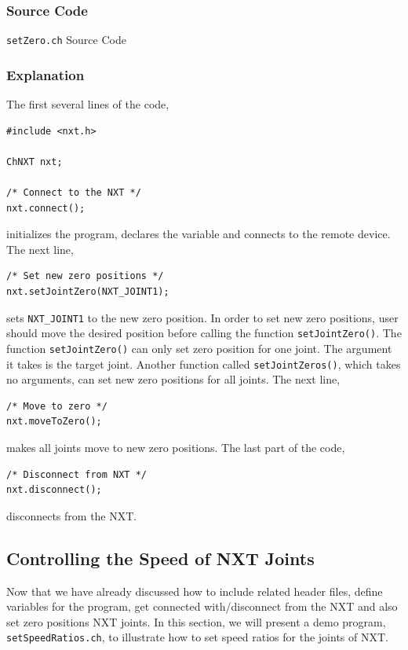 \documentclass[11pt]{article}
\begin{document}
\subsubsection*{Source Code}
\begin{Program}[H]
    {\small}
    \caption{\texttt{setZero.ch} Source Code\label{prog_setZero.ch}}
\end{Program}

\subsubsection*{Explanation}
The first several lines of the code,\\
\begin{verbatim}
#include <nxt.h>

ChNXT nxt;

/* Connect to the NXT */
nxt.connect();
\end{verbatim}
\noindent
initializes the program, declares the variable and connects to the remote device. The next line,
\begin{verbatim}
/* Set new zero positions */
nxt.setJointZero(NXT_JOINT1);
\end{verbatim}
\noindent
sets \texttt{NXT\_JOINT1} to the new zero position. In order to set new zero positions, user should 
move the desired position before calling the function \texttt{setJointZero()}. The function \texttt{setJointZero()} 
can only set zero position for one joint. The argument it takes is the target joint. Another function called 
\texttt{setJointZeros()}, which takes no arguments, can set new zero positions for all joints. The next line,
\begin{verbatim}
/* Move to zero */
nxt.moveToZero();
\end{verbatim}
\noindent
makes all joints move to new zero positions. The last part of the code,
\begin{verbatim}
/* Disconnect from NXT */
nxt.disconnect();
\end{verbatim}
\noindent
disconnects from the NXT.

\subsection{\label{sec:speed_demo}Controlling the Speed of NXT Joints}
Now that we have already discussed how to include related header files, define variables for the program, 
get connected with/disconnect from the NXT and also set zero positions NXT joints. In this section, we will 
present a demo program, \texttt{setSpeedRatios.ch}, to illustrate how to set speed ratios for the joints of NXT.
\end{document}
